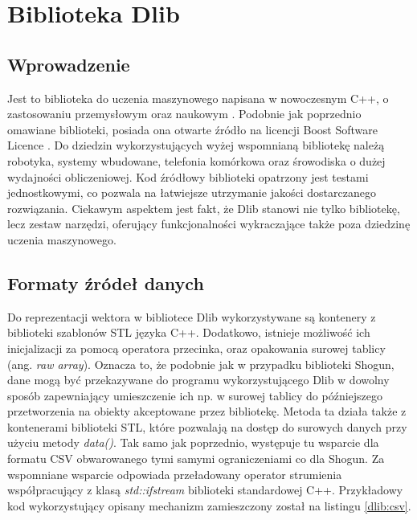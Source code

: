 \chapter{Biblioteka Dlib}

\section{Wprowadzenie}

Jest to biblioteka do uczenia maszynowego napisana w nowoczesnym C++, o zastosowaniu przemysłowym oraz naukowym \cite{Dlib09}. Podobnie jak poprzednio omawiane biblioteki, posiada ona otwarte źródło na licencji Boost Software Licence \cite{dlib:license}. Do dziedzin wykorzystujących wyżej wspomnianą bibliotekę należą robotyka, systemy wbudowane, telefonia komórkowa oraz śrowodiska o dużej wydajności obliczeniowej. Kod źródłowy biblioteki opatrzony jest testami jednostkowymi, co pozwala na łatwiejsze utrzymanie jakości dostarczanego rozwiązania. Ciekawym aspektem jest fakt, że Dlib stanowi nie tylko bibliotekę, lecz zestaw narzędzi, oferujący funkcjonalności wykraczające także poza dziedzinę uczenia maszynowego.

\section{Formaty źródeł danych}

Do reprezentacji wektora w bibliotece Dlib wykorzystywane są kontenery z biblioteki szablonów STL języka C++. Dodatkowo, istnieje możliwość ich inicjalizacji za pomocą operatora przecinka, oraz opakowania surowej tablicy (ang. \textit{raw array}). Oznacza to, że podobnie jak w przypadku biblioteki Shogun, dane mogą być przekazywane do programu wykorzystującego Dlib w dowolny sposób zapewniający umieszczenie ich np. w surowej tablicy do późniejszego przetworzenia na obiekty akceptowane przez bibliotekę. Metoda ta działa także z kontenerami biblioteki STL, które pozwalają na dostęp do surowych danych przy użyciu metody \textit{data()}. Tak samo jak poprzednio, występuje tu wsparcie dla formatu CSV obwarowanego tymi samymi ograniczeniami co dla Shogun. Za wspomniane wsparcie odpowiada przeładowany operator strumienia współpracujący z klasą \textit{std::ifstream} biblioteki standardowej C++. Przykładowy kod wykorzystujący opisany mechanizm zamieszczony został na listingu \ref{dlib:csv}.



